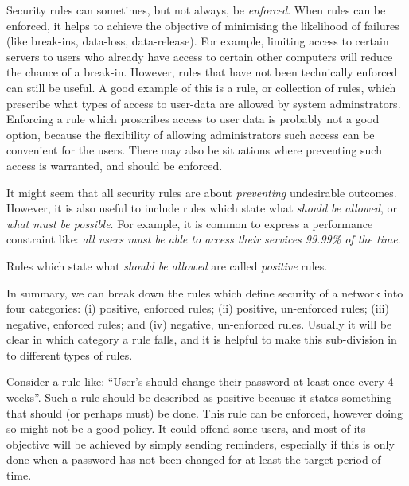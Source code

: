 Security rules can sometimes, but not always, be {\em enforced}. When rules can be enforced,
it helps to achieve the objective of minimising the likelihood of failures (like break-ins, data-loss,
data-release). For example, limiting access to certain servers to users who already have
access to certain other computers will reduce the chance of a break-in. However, rules that
have not been technically enforced can still be useful. A good example of this is a rule, or collection
of rules, which prescribe what types of access to user-data are allowed by system adminstrators.
Enforcing a rule which proscribes access to user data is probably not a good option, because
the flexibility of allowing administrators such access can be convenient for the users. There
may also be situations where preventing such access is warranted, and should be enforced.

It might seem that all security rules are about {\em preventing} undesirable outcomes. However,
it is also useful to include rules which state what {\em should be allowed}, or {\em what must
be possible}. For example, it is common to express a performance constraint like: {\em all users
must be able to access their services 99.99\% of the time}.

Rules which state what {\em should be allowed} are called {\em positive} rules.

In summary, we can break down the rules which define security of a network into four categories:
(i) positive, enforced rules; (ii) positive, un-enforced rules; (iii) negative, enforced rules;
and (iv) negative, un-enforced rules. Usually it will be clear in which category a rule falls,
and it is helpful to make this sub-division in to different types of rules.

Consider a rule like: ``User's should change their password at least once every 4 weeks''. Such a rule
should be described as positive because it states something that should (or perhaps must) be done.
This rule can be enforced, however doing so might not be a good policy. It could offend some users,
and most of its objective will be achieved by simply sending reminders, especially if this is only
done when a password has not been changed for at least the target period of time.

